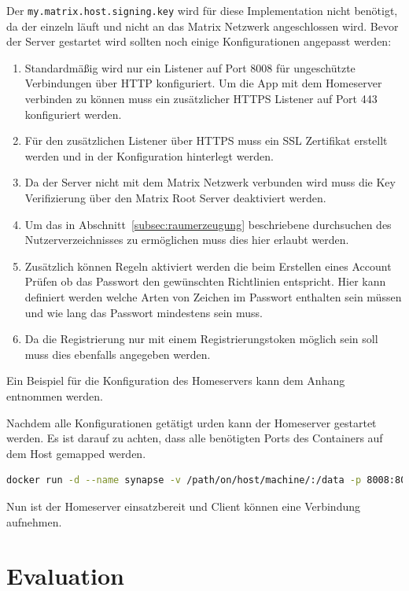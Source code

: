     Der \texttt{my.matrix.host.signing.key} wird für diese Implementation nicht benötigt, da der einzeln läuft und nicht an das Matrix Netzwerk angeschlossen wird.
    Bevor der Server gestartet wird sollten noch einige Konfigurationen angepasst werden:
    \begin{enumerate}
        \item Standardmäßig wird nur ein Listener auf Port 8008 für ungeschützte Verbindungen über HTTP konfiguriert. Um die App mit dem Homeserver verbinden zu können muss ein zusätzlicher HTTPS Listener auf Port 443 konfiguriert werden.
        \item Für den zusätzlichen Listener über HTTPS muss ein SSL Zertifikat erstellt werden und in der Konfiguration hinterlegt werden.
        \item Da der Server nicht mit dem Matrix Netzwerk verbunden wird muss die Key Verifizierung über den Matrix Root Server deaktiviert werden.
        \item Um das in Abschnitt~\ref{subsec:raumerzeugung} beschriebene durchsuchen des Nutzerverzeichnisses zu ermöglichen muss dies hier erlaubt werden.
        \item Zusätzlich können Regeln aktiviert werden die beim Erstellen eines Account Prüfen ob das Passwort den gewünschten Richtlinien entspricht. Hier kann definiert werden welche Arten von Zeichen im Passwort enthalten sein müssen und wie lang das Passwort mindestens sein muss.
        \item Da die Registrierung nur mit einem Registrierungstoken möglich sein soll muss dies ebenfalls angegeben werden.
    \end{enumerate}
    Ein Beispiel für die Konfiguration des Homeservers kann dem Anhang entnommen werden.

    Nachdem alle Konfigurationen getätigt urden kann der Homeserver gestartet werden.
    Es ist darauf zu achten, dass alle benötigten Ports des Containers auf dem Host gemapped werden.

    \begin{lstlisting}[language=bash,label={lst:synapse-start}]
        docker run -d --name synapse -v /path/on/host/machine/:/data -p 8008:8008 -p 443:443 matrixdotorg/synapse:latest
    \end{lstlisting}

    Nun ist der Homeserver einsatzbereit und Client können eine Verbindung aufnehmen.

    \newpage
    \chapter{Evaluation}
